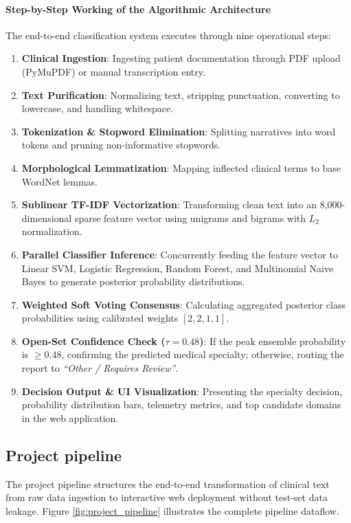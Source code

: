\paragraph{Step-by-Step Working of the Algorithmic Architecture}
The end-to-end classification system executes through nine operational steps:
\begin{enumerate}
    \item \textbf{Clinical Ingestion}: Ingesting patient documentation through PDF upload (PyMuPDF) or manual transcription entry.
    \item \textbf{Text Purification}: Normalizing text, stripping punctuation, converting to lowercase, and handling whitespace.
    \item \textbf{Tokenization \& Stopword Elimination}: Splitting narratives into word tokens and pruning non-informative stopwords.
    \item \textbf{Morphological Lemmatization}: Mapping inflected clinical terms to base WordNet lemmas.
    \item \textbf{Sublinear TF-IDF Vectorization}: Transforming clean text into an 8,000-dimensional sparse feature vector using unigrams and bigrams with $L_2$ normalization.
    \item \textbf{Parallel Classifier Inference}: Concurrently feeding the feature vector to Linear SVM, Logistic Regression, Random Forest, and Multinomial Naive Bayes to generate posterior probability distributions.
    \item \textbf{Weighted Soft Voting Consensus}: Calculating aggregated posterior class probabilities using calibrated weights $[2, 2, 1, 1]$.
    \item \textbf{Open-Set Confidence Check ($\tau = 0.48$)}: If the peak ensemble probability is $\ge 0.48$, confirming the predicted medical specialty; otherwise, routing the report to \textit{``Other / Requires Review''}.
    \item \textbf{Decision Output \& UI Visualization}: Presenting the specialty decision, probability distribution bars, telemetry metrics, and top candidate domains in the web application.
\end{enumerate}

\subsection{Project pipeline}

The project pipeline structures the end-to-end transformation of clinical text from raw data ingestion to interactive web deployment without test-set data leakage. Figure \ref{fig:project_pipeline} illustrates the complete pipeline dataflow.

